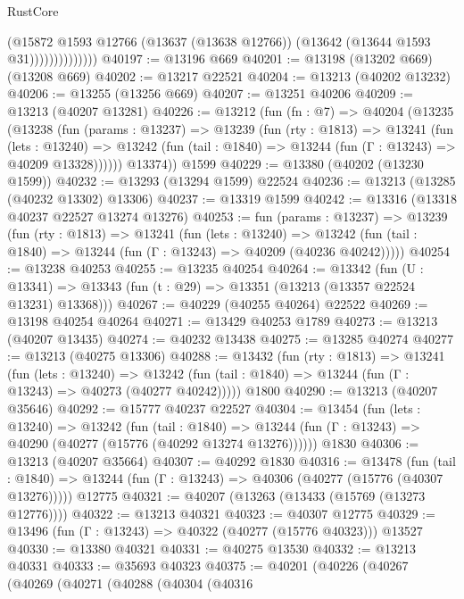 \begin{lexlean}{RustCore}
\begin{coremodule}
                          (@15872
                            @1593
                            @12766
                            (@13637 (@13638 @12766))
                            (@13642 (@13644 @1593 @31))))))))))))))
@40197 := @13196 @669
@40201 := @13198 (@13202 @669) (@13208 @669)
@40202 := @13217 @22521
@40204 := @13213 (@40202 @13232)
@40206 := @13255 (@13256 @669)
@40207 := @13251 @40206
@40209 := @13213 (@40207 @13281)
@40226 := @13212
    (fun (fn : @7) =>
    @40204
      (@13235
        (@13238
          (fun (params : @13237) =>
          @13239
            (fun (rty : @1813) =>
            @13241
              (fun (lets : @13240) =>
              @13242 (fun (tail : @1840) => @13244 (fun (Γ : @13243) => @40209 @13328))))))
        @13374))
    @1599
@40229 := @13380 (@40202 (@13230 @1599))
@40232 := @13293 (@13294 @1599) @22524
@40236 := @13213 (@13285 (@40232 @13302) @13306)
@40237 := @13319 @1599
@40242 := @13316 (@13318 @40237 @22527 @13274 @13276)
@40253 := fun (params : @13237) =>
  @13239
    (fun (rty : @1813) =>
    @13241
      (fun (lets : @13240) =>
      @13242 (fun (tail : @1840) => @13244 (fun (Γ : @13243) => @40209 (@40236 @40242)))))
@40254 := @13238 @40253
@40255 := @13235 @40254
@40264 := @13342
    (fun (U : @13341) => @13343 (fun (t : @29) => @13351 (@13213 (@13357 @22524 @13231) @13368)))
@40267 := @40229 (@40255 @40264) @22522
@40269 := @13198 @40254 @40264
@40271 := @13429 @40253 @1789
@40273 := @13213 (@40207 @13435)
@40274 := @40232 @13438
@40275 := @13285 @40274
@40277 := @13213 (@40275 @13306)
@40288 := @13432
    (fun (rty : @1813) =>
    @13241
      (fun (lets : @13240) =>
      @13242 (fun (tail : @1840) => @13244 (fun (Γ : @13243) => @40273 (@40277 @40242)))))
    @1800
@40290 := @13213 (@40207 @35646)
@40292 := @15777 @40237 @22527
@40304 := @13454
    (fun (lets : @13240) =>
    @13242
      (fun (tail : @1840) =>
      @13244 (fun (Γ : @13243) => @40290 (@40277 (@15776 (@40292 @13274 @13276))))))
    @1830
@40306 := @13213 (@40207 @35664)
@40307 := @40292 @1830
@40316 := @13478
    (fun (tail : @1840) => @13244 (fun (Γ : @13243) => @40306 (@40277 (@15776 (@40307 @13276)))))
    @12775
@40321 := @40207 (@13263 (@13433 (@15769 (@13273 @12776))))
@40322 := @13213 @40321
@40323 := @40307 @12775
@40329 := @13496 (fun (Γ : @13243) => @40322 (@40277 (@15776 @40323))) @13527
@40330 := @13380 @40321
@40331 := @40275 @13530
@40332 := @13213 @40331
@40333 := @35693 @40323
@40375 := @40201
    (@40226
      (@40267
        (@40269
          (@40271
            (@40288
              (@40304
                (@40316

\end{coremodule}
\end{lexlean}
